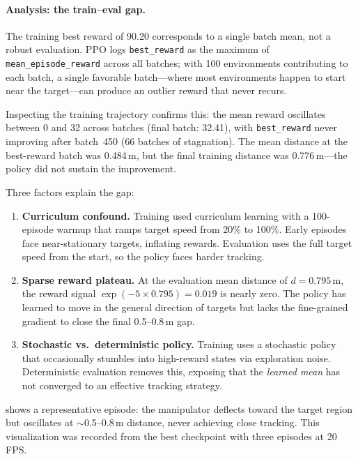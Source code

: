 \documentclass[11pt]{article}
\begin{document}
\paragraph{Analysis: the train--eval gap.}
The training best reward of 90.20 corresponds to a single batch mean, not a robust evaluation.
PPO logs \texttt{best\_reward} as the maximum of \texttt{mean\_episode\_reward} across all batches; with 100 environments contributing to each batch, a single favorable batch---where most environments happen to start near the target---can produce an outlier reward that never recurs.

Inspecting the training trajectory confirms this: the mean reward oscillates between 0 and 32 across batches (final batch: 32.41), with \texttt{best\_reward} never improving after batch~450 (66 batches of stagnation).
The mean distance at the best-reward batch was 0.484\,m, but the final training distance was 0.776\,m---the policy did not sustain the improvement.

Three factors explain the gap:

\begin{enumerate}
  \item \textbf{Curriculum confound.}
  Training used curriculum learning with a 100-episode warmup that ramps target speed from 20\% to 100\%.
  Early episodes face near-stationary targets, inflating rewards.
  Evaluation uses the full target speed from the start, so the policy faces harder tracking.

  \item \textbf{Sparse reward plateau.}
  At the evaluation mean distance of $d{=}0.795$\,m, the reward signal $\exp(-5 \times 0.795) = 0.019$ is nearly zero.
  The policy has learned to move in the general direction of targets but lacks the fine-grained gradient to close the final 0.5--0.8\,m gap.

  \item \textbf{Stochastic vs.\ deterministic policy.}
  Training uses a stochastic policy that occasionally stumbles into high-reward states via exploration noise.
  Deterministic evaluation removes this, exposing that the \emph{learned mean} has not converged to an effective tracking strategy.
\end{enumerate}

\noindent
{} shows a representative episode: the manipulator deflects toward the target region but oscillates at ${\sim}$0.5--0.8\,m distance, never achieving close tracking.
This visualization was recorded from the best checkpoint with three episodes at 20\,FPS.
\end{document}
